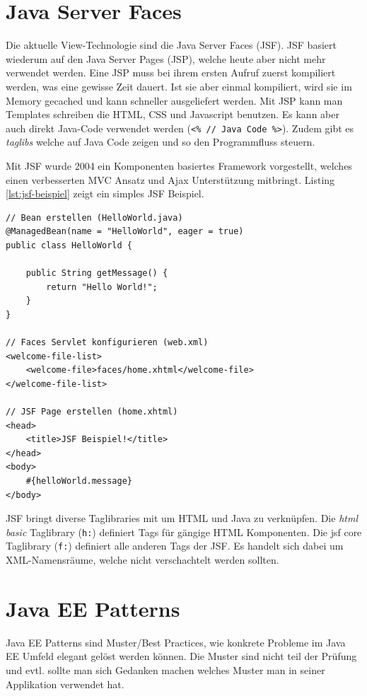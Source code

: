 \section{Java Server Faces}

Die aktuelle View-Technologie sind die Java Server Faces (JSF). JSF basiert wiederum auf den Java Server Pages (JSP), welche heute aber nicht mehr verwendet werden. Eine JSP muss bei ihrem ersten Aufruf zuerst kompiliert werden, was eine gewisse Zeit dauert. Ist sie aber einmal kompiliert, wird sie im Memory gecached und kann schneller ausgeliefert werden. Mit JSP kann man Templates schreiben die HTML, CSS und Javascript benutzen. Es kann aber auch direkt Java-Code verwendet werden (\verb|<% // Java Code %>|). Zudem gibt es \textit{taglibs} welche auf Java Code zeigen und so den Programmfluss steuern.

Mit JSF wurde 2004 ein Komponenten basiertes Framework vorgestellt, welches einen verbesserten MVC Ansatz und Ajax Unterstützung mitbringt. Listing \ref{lst:jsf-beispiel} zeigt ein simples JSF Beispiel.

\begin{lstlisting}[caption=JSF Beispiel, label=lst:jsf-beispiel]
// Bean erstellen (HelloWorld.java)
@ManagedBean(name = "HelloWorld", eager = true)
public class HelloWorld {

	public String getMessage() {
		return "Hello World!";
	}
}

// Faces Servlet konfigurieren (web.xml)
<welcome-file-list>
	<welcome-file>faces/home.xhtml</welcome-file>
</welcome-file-list>

// JSF Page erstellen (home.xhtml)
<head>
	<title>JSF Beispiel!</title>
</head>
<body>
	#{helloWorld.message}
</body>
\end{lstlisting}

JSF bringt diverse Taglibraries mit um HTML und Java zu verknüpfen. Die \textit{html basic} Taglibrary (\verb|h:|) definiert Tags für gängige HTML Komponenten. Die jsf core Taglibrary (\verb|f:|) definiert alle anderen Tags der JSF. Es handelt sich dabei um XML-Namensräume, welche nicht verschachtelt werden sollten.

\section{Java EE Patterns}
Java EE Patterns sind Muster/Best Practices, wie konkrete Probleme im Java EE Umfeld elegant gelöst werden können. Die Muster sind nicht teil der Prüfung und evtl. sollte man sich Gedanken machen welches Muster man in seiner Applikation verwendet hat.

